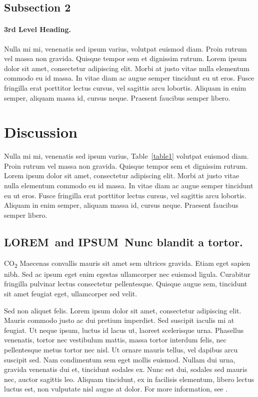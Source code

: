 \documentclass[10pt,letterpaper]{article}
\newcommand{\lorem}{{\bf LOREM}}
\newcommand{\ipsum}{{\bf IPSUM}}
\begin{document}
\subsection*{Subsection 2}
\paragraph{3rd Level Heading.} Nulla mi mi, venenatis sed ipsum varius, volutpat
euismod diam. Proin rutrum vel massa non gravida. Quisque tempor sem et
dignissim rutrum. Lorem ipsum dolor sit amet, consectetur adipiscing elit. Morbi
at justo vitae nulla elementum commodo eu id massa. In vitae diam ac augue
semper tincidunt eu ut eros. Fusce fringilla erat porttitor lectus cursus, vel
sagittis arcu lobortis. Aliquam in enim semper, aliquam massa id, cursus neque.
Praesent faucibus semper libero.

\section*{Discussion}
Nulla mi mi, venenatis sed ipsum varius, Table~\ref{table1} volutpat euismod
diam. Proin rutrum vel massa non gravida. Quisque tempor sem et dignissim
rutrum. Lorem ipsum dolor sit amet, consectetur adipiscing elit. Morbi at justo
vitae nulla elementum commodo eu id massa. In vitae diam ac augue semper
tincidunt eu ut eros. Fusce fringilla erat porttitor lectus cursus, vel sagittis
arcu lobortis. Aliquam in enim semper, aliquam massa id, cursus neque. Praesent
faucibus semper libero.

\subsection*{\lorem\ and \ipsum\ Nunc blandit a tortor.}

CO\textsubscript{2} Maecenas convallis mauris sit amet sem ultrices gravida.
Etiam eget sapien nibh. Sed ac ipsum eget enim egestas ullamcorper nec euismod
ligula. Curabitur fringilla pulvinar lectus consectetur pellentesque. Quisque
augue sem, tincidunt sit amet feugiat eget, ullamcorper sed velit.

Sed non aliquet felis. Lorem ipsum dolor sit amet, consectetur adipiscing elit.
Mauris commodo justo ac dui pretium imperdiet. Sed suscipit iaculis mi at
feugiat. Ut neque ipsum, luctus id lacus ut, laoreet scelerisque urna. Phasellus
venenatis, tortor nec vestibulum mattis, massa tortor interdum felis, nec
pellentesque metus tortor nec nisl. Ut ornare mauris tellus, vel dapibus arcu
suscipit sed. Nam condimentum sem eget mollis euismod. Nullam dui urna, gravida
venenatis dui et, tincidunt sodales ex. Nunc est dui, sodales sed mauris nec,
auctor sagittis leo. Aliquam tincidunt, ex in facilisis elementum, libero lectus
luctus est, non vulputate nisl augue at dolor. For more information, see
.
\end{document}

